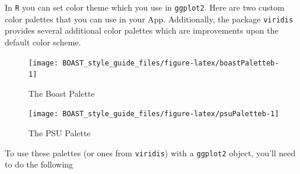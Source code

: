 \documentclass[
]{book}
\newenvironment{Shaded}{\begin{snugshade}}{\end{snugshade}}
\newcommand{\CommentTok}[1]{\textcolor[rgb]{0.56,0.35,0.01}{\textit{#1}}}
\newcommand{\KeywordTok}[1]{\textcolor[rgb]{0.13,0.29,0.53}{\textbf{#1}}}
\newcommand{\NormalTok}[1]{#1}
\newcommand{\StringTok}[1]{\textcolor[rgb]{0.31,0.60,0.02}{#1}}
\begin{document}
In \texttt{R} you can set color theme which you use in \texttt{ggplot2}. Here are two custom color palettes that you can use in your App. Additionally, the package \texttt{viridis} provides several additional color palettes which are improvements upon the default color scheme.

\begin{Shaded}
\end{Shaded}

\begin{figure}

{\centering \texttt{[image: BOAST\_style\_guide\_files/figure-latex/boastPaletteb-1]} 

}

\caption{The Boast Palette}\label{fig:boastPaletteb}
\end{figure}

\begin{figure}

{\centering \texttt{[image: BOAST\_style\_guide\_files/figure-latex/psuPaletteb-1]} 

}

\caption{The PSU Palette}\label{fig:psuPaletteb}
\end{figure}

To use these palettes (or ones from \texttt{viridis}) with a \texttt{ggplot2} object, you'll need to do the following
\end{document}
